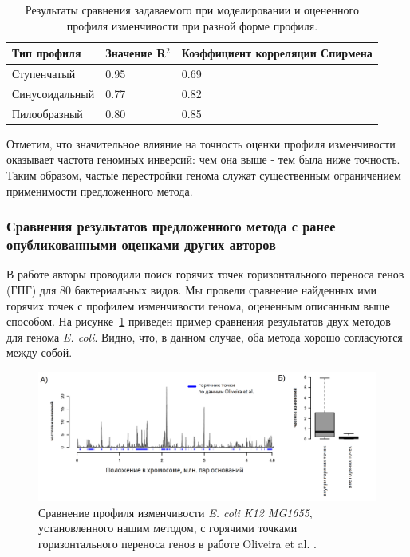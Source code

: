 \begin{table} [htbp]
  \centering
  \parbox{15cm}{%
      \caption{Результаты сравнения задаваемого при моделировании и оцененного профиля изменчивости при разной форме профиля.}\label{simulation_table}%
  }
\begin{tabular}{ | l | l | l | }
\hline
Тип профиля & Значение R$^{2}$ & Коэффициент корреляции Спирмена\\ \hline
Ступенчатый & 0.95 & 0.69 \\ \hline
Синусоидальный & 0.77 & 0.82 \\ \hline
Пилообразный & 0.80 & 0.85 \\ 
\hline
\end{tabular}
\end{table}

Отметим, что значительное влияние на точность оценки профиля изменчивости оказывает частота геномных инверсий: чем она выше - тем была ниже точность. Таким образом, частые перестройки генома служат существенным ограничением применимости предложенного метода. 

\subsubsection{Сравнения результатов предложенного метода с ранее опубликованными оценками других авторов}
В работе \cite{oliveira2017chromosomal} авторы проводили поиск горячих точек горизонтального переноса генов (ГПГ) для 80 бактериальных видов. Мы провели сравнение найденных ими горячих точек с профилем изменчивости генома, оцененным описанным выше способом. На рисунке~\ref{img:rocha_comparison} приведен пример сравнения результатов двух методов для генома \textit{E. coli}. Видно, что, в данном случае, оба метода хорошо согласуются между собой.     

\begin{figure}[!ht] 
  \center
    \includegraphics[width=\textwidth]{Dissertation/images/complexity/rocha_comparepng.png}
  \caption{Сравнение профиля изменчивости \textit{E. coli K12 MG1655}, установленного нашим методом, с горячими точками горизонтального переноса генов в работе Oliveira et al. \cite{oliveira2017chromosomal}. }
  \label{img:rocha_comparison} 
\end{figure}

